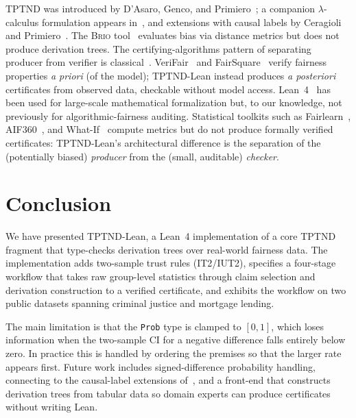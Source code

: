 \documentclass{ceurart}
\begin{document}
TPTND was introduced by D'Asaro, Genco, and
Primiero~\cite{dasaro2025tptnd}; a companion $\lambda$-calculus
formulation appears in~\cite{genco2023lambda}, and extensions
with causal labels by Ceragioli and
Primiero~\cite{ceragioli2025causal1,ceragioli2025causal2}.
The \textsc{Brio} tool~\cite{brio2023} evaluates bias via distance
metrics but does not produce derivation trees.
The certifying-algorithms pattern of separating producer from
verifier is classical~\cite{necula1997pcc,mcconnell2011certifying}.
VeriFair~\cite{bastani2019verifair} and
FairSquare~\cite{albarghouthi2017fairsquare} verify fairness
properties \emph{a priori} (of the model); TPTND-Lean instead produces
\emph{a posteriori} certificates from observed data, checkable
without model access.  Lean~4~\cite{moura2021lean4} has been used
for large-scale mathematical formalization but, to our knowledge,
not previously for algorithmic-fairness auditing.  Statistical
toolkits such as Fairlearn~\cite{bird2020fairlearn},
AIF360~\cite{bellamy2019aif360}, and
What-If~\cite{wexler2019whatif} compute metrics but do not
produce formally verified certificates: TPTND-Lean's architectural
difference is the separation of the (potentially biased)
\emph{producer} from the (small, auditable) \emph{checker}.

\section{Conclusion}\label{sec:concl}

We have presented TPTND-Lean, a Lean~4 implementation of a core TPTND
fragment that type-checks derivation trees over real-world
fairness data.
The implementation adds two-sample trust rules (\textsc{IT2}/\textsc{IUT2}),
specifies a four-stage workflow that takes raw group-level
statistics through claim selection and derivation construction
to a verified certificate, and exhibits the workflow on two
public datasets spanning criminal justice and mortgage lending.

The main limitation is that the \texttt{Prob} type is clamped
to $[0,1]$, which loses information when the two-sample CI
for a negative difference falls entirely below zero.
In practice this is handled by ordering the premises so
that the larger rate appears first.
Future work includes signed-difference probability handling,
connecting to the causal-label extensions
of~\cite{ceragioli2025causal1}, and a front-end that constructs
derivation trees from tabular data so domain experts can produce
certificates without writing Lean.
\end{document}
